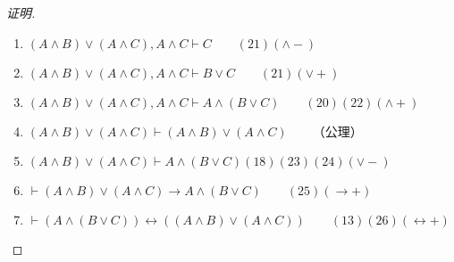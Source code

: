 \documentclass{article}
\begin{document}
\begin{CJK*}{UTF8}{gbsn}
\begin{proof}[证明]
\begin{enumerate}
      \item $(A\land B) \lor (A\land C), A\land C \vdash C \qquad (21)(\land -) $
      \item $(A\land B) \lor (A\land C), A\land C \vdash B\lor C \qquad (21)(\lor +)  $ 
      \item $(A\land B) \lor (A\land C), A\land C \vdash A\land(B\lor C) \qquad (20)(22)(\land +)$
      \item $(A\land B) \lor (A\land C)\vdash(A\land B) \lor (A\land C)  \qquad$（公理）
      \item $ (A\land B) \lor (A\land C)\vdash A\land(B\lor C)(18)(23)(24)(\lor -)\qquad$
      \item $\vdash (A\land B) \lor (A\land C)\to A\land(B\lor C)\qquad(25)(\to +)$
      \item $\vdash (A\land (B\lor C))\leftrightarrow ((A\land B) \lor (A\land C))\qquad(13)(26)(\leftrightarrow +)$
    \end{enumerate}
  \end{proof}


\end{CJK*}
\end{document}
